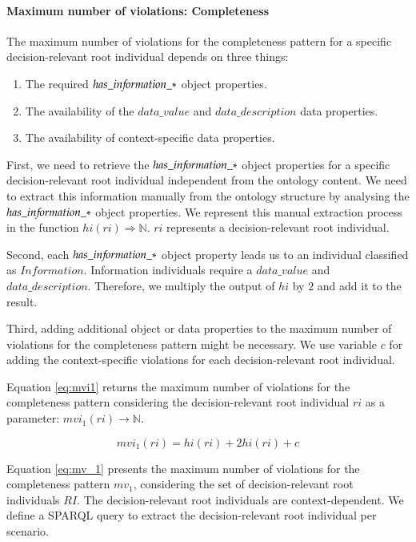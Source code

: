 \paragraph{Maximum number of violations: Completeness}
The maximum number of violations for the completeness pattern for a specific decision-relevant root individual depends on three things: 
\begin{enumerate}
\item The required $has\_in{\mkern-2mu f\mkern-3mu}ormation\_*$ object properties.
\item The availability of the $data\_value$ and $data\_description$ data properties.
\item The availability of context-specific data properties.  
\end{enumerate}

First, we need to retrieve the $has\_in{\mkern-2mu f\mkern-3mu}ormation\_*$ object properties for a specific decision-relevant root individual independent from the ontology content. We need to extract this information manually from the ontology structure by analysing the $has\_in{\mkern-2mu f\mkern-3mu}ormation\_*$ object properties. We represent this manual extraction process in the function $hi(ri) \Rightarrow \mathbb{N}$. $ri$ represents a decision-relevant root individual.

Second, each $has\_in{\mkern-2mu f\mkern-3mu}ormation\_*$ object property leads us to an individual classified as $Information$. Information individuals require a $data\_value$ and $data\_description$. Therefore, we multiply the output of $hi$ by $2$ and add it to the result. 

Third, adding additional object or data properties to the maximum number of violations for the completeness pattern might be necessary. We use variable $c$ for adding the context-specific violations for each decision-relevant root individual.

Equation \ref{eq:mvi1} returns the maximum number of violations for the completeness pattern considering the decision-relevant root individual $ri$ as a parameter: $mvi_1(ri) \rightarrow \mathbb{N}$.

\begin{equation} \label{eq:mvi1}
mvi_1(ri) = hi(ri) + 2hi(ri) + c
\end{equation}

Equation \ref{eq:mv_1} presents the maximum number of violations for the completeness pattern $mv_1$, considering the set of decision-relevant root individuals $RI$. The decision-relevant root individuals are context-dependent. We define a SPARQL query to extract the decision-relevant root individual per scenario.  

